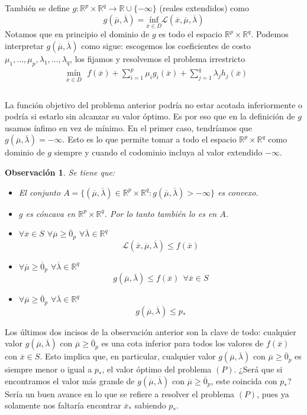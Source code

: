 \documentclass[11pt]{report}
\newtheorem{observation}{Observación}[section]
\newcommand{\Rp}{\mathbb{R}^{p}}
\newcommand{\Rq}{\mathbb{R}^{q}}
\newcommand{\R}{\mathbb{R}}
\newcommand{\mv}{\overline{\mu}}
\newcommand{\lv}{\overline{\lambda}}
\newcommand{\x}{\overline{x}}
\newcommand{\zp}{\overline{0}_{p}}
\newcommand{\La}{\mathcal{L}}
\newcommand{\po}{p_{*}}
\newcommand{\xo}{\overline{x}_{*}}
\begin{document}
También se define $g:\Rp\times\Rq\rightarrow\R\cup\{-\infty\}$ (reales extendidos) como
$$g(\mv, \lv)= \underset{\x\in D}{\text{ínf}}\La(\x,\mv,\lv)$$
Notamos que en principio el dominio de $g$ es todo el espacio $\Rp\times\Rq$. Podemos interpretar $g(\mv,\lv)$ como sigue: escogemos los coeficientes de costo $\mu_{1},\ldots,\mu_{p}, \lambda_{1},\ldots,\lambda_{q}$, los fijamos y resolvemos el problema irrestricto
\begin{equation*}
\begin{aligned}
& \underset{\x\in D}{\text{mín}}\ \ \ f(\x)+\sum_{i=1}^{p}\mu_{i} g_{i}(\x) + \sum_{j=1}^{q}\lambda_{j} h_{j}(\x) \\
\end{aligned}
\end{equation*}\\

La función objetivo del problema anterior podría no estar acotada inferiormente o podría si estarlo sin alcanzar su valor óptimo. Es por eso que en la definición de $g$ usamos ínfimo en vez de mínimo. En el primer caso, tendríamos que $g(\mv, \lv)=-\infty$. Esto es lo que permite tomar a todo el espacio $\Rp\times\Rq$ como dominio de $g$ siempre y cuando el codominio incluya al valor extendido $-\infty$.

\begin{observation} Se tiene que:
\begin{itemize}
\item[(i)] El conjunto $A=\{(\mv,\lv)\in\Rp\times\Rq: g(\mv,\lv)>-\infty\}$ es convexo.
\item[(ii)] $g$ es cóncava en $\Rp\times\Rq$. Por lo tanto también lo es en $A$.
\item[(iii)] $\forall\x\in S$ $\forall \mv\geq\zp$ $\forall\lv\in\Rq$
$$\La(\x,\mv, \lv)\leq f(\x)$$
\item[(iv)] $\forall \mv\geq\zp$ $\forall\lv\in\Rq$
$$g(\mv,\lv)\leq f(\x)\ \ \forall\x \in S$$
\item[(v)] $\forall \mv\geq\zp$ $\forall\lv\in\Rq$
$$g(\mv,\lv)\leq\po$$
\end{itemize}
\end{observation}

Los últimos dos incisos de la observación anterior son la clave de todo: cualquier valor $g(\mv,\lv)$ con $\mv\geq\zp$ es una cota inferior para todos los valores de $f(\x)$ con $\x\in S$. Esto implica que, en particular, cualquier valor $g(\mv,\lv)$ con $\mv\geq\zp$ es siempre menor o igual a $\po$, el valor óptimo del problema $(P)$. ¿Será que si encontramos el valor más grande de $g(\mv,\lv)$ con $\mv\geq\zp$, este coincida con $\po$? Sería un buen avance en lo que se refiere a resolver el problema $(P)$, pues ya solamente nos faltaría encontrar $\xo$ sabiendo $\po$.\\
\end{document}
